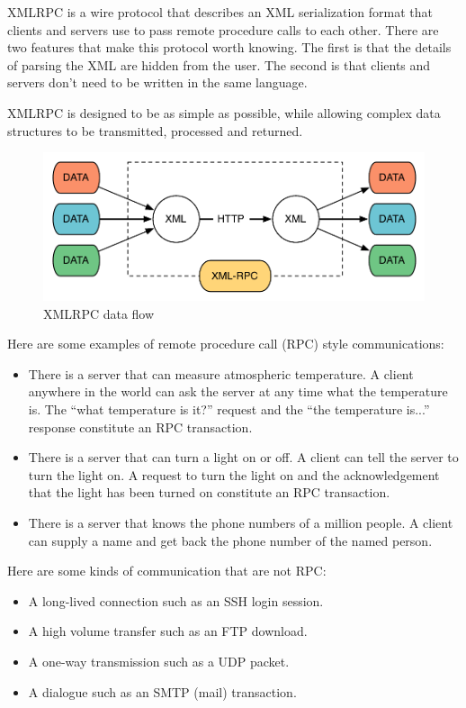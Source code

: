 XMLRPC is a wire protocol that describes an XML serialization format that
clients and servers use to pass remote procedure calls to each other. There are
two features that make this protocol worth knowing. The first is that the
details of parsing the XML are hidden from the user. The second is that clients
and servers don't need to be written in the same language.

XMLRPC is designed to be as simple as possible, while allowing complex data
structures to be transmitted, processed and returned.

\begin{figure}[H]
	\center
	\includegraphics[scale=0.5]{intro/xmlrpc}
	\caption{XMLRPC data flow}
\end{figure}


Here are some examples of remote procedure call (RPC) style communications:

\begin{itemize}
	\item There is a server that can measure atmospheric temperature. A client
		anywhere in the world can ask the server at any time what the
		temperature is. The ``what temperature is it?'' request and the
		``the temperature is...'' response constitute an RPC transaction.
	\item There is a server that can turn a light on or off. A client can tell
		the server to turn the light on. A request to turn the light on and
		the acknowledgement that the light has been turned on constitute an
		RPC transaction.
	\item There is a server that knows the phone numbers of a million people.
		A client can supply a name and get back the phone number of the named
		person.
\end{itemize}

Here are some kinds of communication that are not RPC:

\begin{itemize}
	\item A long-lived connection such as an SSH login session.
	\item A high volume transfer such as an FTP download.
	\item A one-way transmission such as a UDP packet.
	\item A dialogue such as an SMTP (mail) transaction.
\end{itemize}

